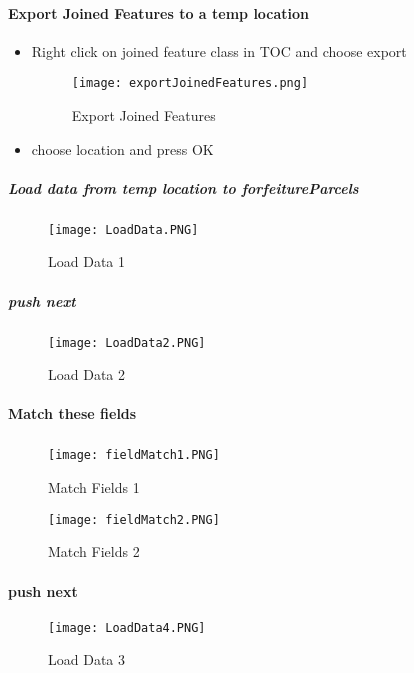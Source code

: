 \documentclass[class=book , crop=false, titlepage, twoside, multi={itemize, figure, verbatim}, float=false]{standalone}
\begin{document}
\paragraph[Export Joined Features]{Export Joined Features to a temp location \texorpdfstring{\\}{}}
%
\begin{itemize}
\item Right click  on joined feature class in TOC and choose export
%
%
\begin{figure}[h!]
\centering
    \texttt{[image: exportJoinedFeatures.png]}
\caption{Export Joined Features}
\end{figure}
\item choose location and press OK
\end{itemize}
\clearpage
%
%
%
\subparagraph[Load data to forfeitureParcels]{\Large Load data from temp location to forfeitureParcels}
\subparagraph*{}
%
%
\begin{figure}[h!]
\centering
    \texttt{[image: LoadData.PNG]}
\caption{Load Data 1}
\end{figure}
\clearpage
%
%
%
\subparagraph*{\Large push next}
%
%
\begin{figure}[h!]
\centering
    \texttt{[image: LoadData2.PNG]}
\caption{Load Data 2}
\end{figure}
\clearpage
%
%
%
\paragraph[Match these fields]{\Large Match these fields}
\subparagraph*{}
%
%
\begin{figure}[h!]
\centering
    \texttt{[image: fieldMatch1.PNG]}
\caption{Match Fields 1}
\end{figure}
\begin{figure}[h!]
\centering
    \texttt{[image: fieldMatch2.PNG]}
\caption{Match Fields 2}
\end{figure}
\clearpage
%
%
%
\paragraph*{\Large push next}
%
%
\begin{figure}[h!]
\centering
    \texttt{[image: LoadData4.PNG]}
\caption{Load Data 3}
\end{figure}
%
\end{document}
